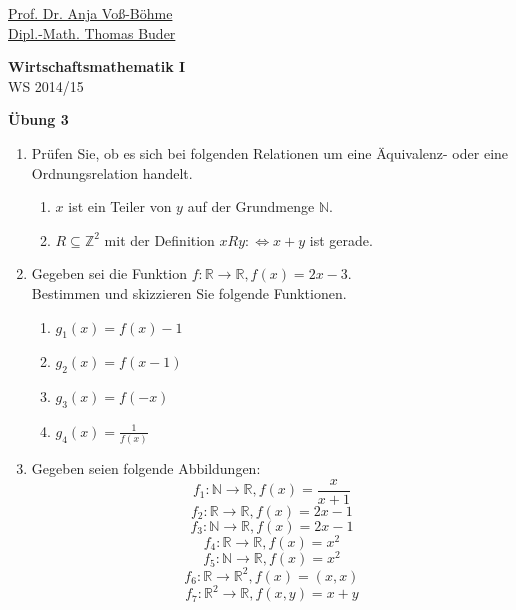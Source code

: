 \documentclass[12pt,a4paper]{scrreprt}
\newcommand{\N}{\mathds{N}}
\newcommand{\Z}{\mathds{Z}}
\newcommand{\R}{\mathds{R}}
\begin{document}
 
\begin{flushleft}
\href{mailto:anja.voss-boehme@htw-dresden.de}{Prof. Dr. Anja Voß-Böhme} \\
\href{mailto:buder@htw-dresden.de}{Dipl.-Math. Thomas Buder}
\end{flushleft}

\begin{center}
\large{\textbf{ Wirtschaftsmathematik I}} \\
WS 2014/15 \end{center}

\begin{center}\large{\textbf{ Übung 3 }} \end{center}

\bigskip
\begin{enumerate}
 			
\item Prüfen Sie, ob es sich bei folgenden Relationen um eine Äquivalenz- oder eine Ordnungsrelation handelt.

		\begin{enumerate}
			\item $x$ ist ein Teiler von $y$ auf der Grundmenge $\N$.
			\item $ R\subseteq \Z^2$ mit der Definition $x R y:\Leftrightarrow x+y$ ist gerade.
		\end{enumerate}
		
		
\item Gegeben sei die Funktion $f: \R \to \R, f(x)=2x-3.$ \\
			Bestimmen und skizzieren Sie folgende Funktionen.
 \begin{enumerate}
			\item $g_1(x)=f(x)-1$
			\item $g_2(x)=f(x-1)$
			\item $g_3(x)=f(-x)$
			\item $g_4(x)=\frac{1}{f(x)}$
 \end{enumerate}

 \item Gegeben seien folgende Abbildungen: \\
\[f_1: \N \to \R,   f(x)=\frac{x}{x+1}\]
\[f_2: \R \to \R,   f(x)=2x-1\]
\[f_3: \N \to \R,   f(x)=2x-1\]
\[f_4: \R \to \R,   f(x)=x^2\]
\[f_5: \N \to \R,   f(x)=x^2\]
\[f_6: \R \to \R^2, f(x)=(x,x) \]
\[f_7: \R^2 \to \R, f(x,y) = x+y \] 


\end{enumerate}
\end{document}
